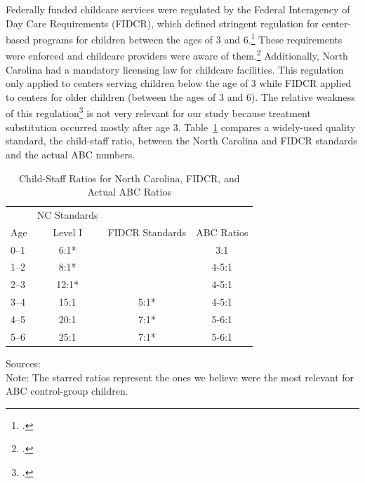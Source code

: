 \begin{appendices}
\noindent Federally funded childcare services were regulated by the Federal Interagency of Day Care Requirements (FIDCR), which defined stringent regulation for center-based programs for children between the ages of 3 and 6.\footnote{\citet{Department-of-Health_1968_DayCareRequirements}.} These requirements were enforced and childcare providers were aware of them.\footnote{\citet{Kuperman_2015_Clifford-Russell-Interview}.} Additionally, North Carolina had a mandatory licensing law for childcare facilities. This regulation only applied to centers serving children below the age of 3 while FIDCR applied to centers for older children (between the ages of 3 and 6). The relative weakness of this regulation\footnote{\citet{NCGA_1971_House-Bill-100}.} is not very relevant for our study because treatment substitution occurred mostly after age 3. Table~\ref{table:staff} compares a widely-used quality standard, the child-staff ratio, between the North Carolina and FIDCR standards and the actual ABC numbers.

\begin{table}[H]
\caption{Child-Staff Ratios for North Carolina, FIDCR, and Actual ABC Ratios}
\label{table:staff}
\begin{threeparttable}
\begin{tabular}{lccc}
\hline \hline
 &NC Standards &	&  \\
Age	& Level I & FIDCR Standards  & ABC Ratios\\ \hline
0--1	& 6:1*	&  				& 	3:1					\\
1--2	& 8:1* 	& 				&   4-5:1				\\
2--3	& 12:1* & 				& 	4-5:1				\\
3--4	& 15:1 	& 		5:1*	& 	4-5:1 				\\
4--5	& 20:1 	& 		7:1*	& 	5-6:1 				\\
5--6 & 25:1  &		7:1*	&	5-6:1				\\
\hline \hline
\end{tabular}
\begin{tablenotes}
\footnotesize
Sources: \cite{Department-of-Health_1968_DayCareRequirements,NCGA_1971_House-Bill-100,Ramey-et-al_1977_Intro-to-ABC,Ramey_Campbell_1979_SR,Ramey_McGinness_etal_1982_Abecedarianapproach} \\
Note: The starred ratios represent the ones we believe were the most relevant for ABC control-group children.
\end{tablenotes}
\end{threeparttable}
\end{table}


\end{appendices}
